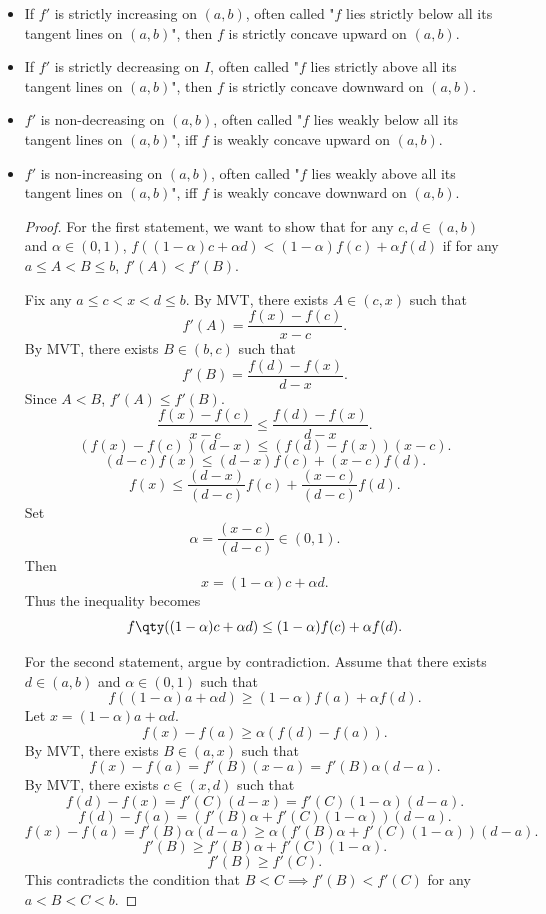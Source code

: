 \documentclass[a4paper,12pt]{report}
\begin{document}
\begin{itemize}
\begin{itemize}
\subsubsection{First Derivative Test for Concavity Theorem}
Let $f\colon I\subseteq\bbR\to\bbR$ be a function that is differentiable on an open interval $(a,b)\subseteq I$.
\bit
\item If $f'$ is strictly increasing on $(a,b)$, often called "$f$ lies strictly below all its tangent lines on $(a,b)$", then $f$ is strictly concave upward on $(a,b)$.
\item If $f'$ is strictly decreasing on $I$, often called "$f$ lies strictly above all its tangent lines on $(a,b)$", then $f$ is strictly concave downward on $(a,b)$.
\item $f'$ is non-decreasing on $(a,b)$, often called "$f$ lies weakly below all its tangent lines on $(a,b)$", iff $f$ is weakly concave upward on $(a,b)$.
\item $f'$ is non-increasing on $(a,b)$, often called "$f$ lies weakly above all its tangent lines on $(a,b)$", iff $f$ is weakly concave downward on $(a,b)$.
\eit
\begin{proof}
    For the first statement, we want to show that for any $c,d\in (a,b)$ and $\alpha\in(0,1)$, $f((1-\alpha)c+\alpha d)<(1-\alpha)f(c)+\alpha f(d)$ if for any $a\leq A<B\leq b$, $f'(A)<f'(B)$.

    Fix any $a\leq c<x<d\leq b$. By MVT, there exists $A\in (c,x)$ such that
    \[f'(A)=\frac{f(x)-f(c)}{x-c}.\]
    By MVT, there exists $B\in (b,c)$ such that
    \[f'(B)=\frac{f(d)-f(x)}{d-x}.\]
    Since $A<B$, $f'(A)\leq f'(B)$.
    \[\frac{f(x)-f(c)}{x-c}\leq\frac{f(d)-f(x)}{d-x}.\]
    \[(f(x)-f(c))(d-x)\leq(f(d)-f(x))(x-c).\]
    \[(d-c)f(x)\leq(d-x)f(c)+(x-c)f(d).\]
    \[f(x)\leq\frac{(d-x)}{(d-c)}f(c)+\frac{(x-c)}{(d-c)}f(d).\]
    Set
    \[\alpha=\frac{(x-c)}{(d-c)}\in(0,1).\]
    Then
    \[x=(1-\alpha)c+\alpha d.\]
    Thus the inequality becomes
    \[f\qty((1-\alpha)c+\alpha d)\leq(1-\alpha)f(c)+\alpha f(d).\]
    
    For the second statement, argue by contradiction. Assume that there exists $d\in(a,b)$ and $\alpha\in(0,1)$ such that
    \[f((1-\alpha)a+\alpha d)\geq (1-\alpha)f(a)+\alpha f(d).\]
    Let $x=(1-\alpha)a+\alpha d$.
    \[f(x)-f(a)\geq\alpha(f(d)-f(a)).\]
    By MVT, there exists $B\in (a,x)$ such that
    \[f(x)-f(a)=f'(B)(x-a)=f'(B)\alpha (d-a).\]
    By MVT, there exists $c\in (x,d)$ such that
    \[f(d)-f(x)=f'(C)(d-x)=f'(C)(1-\alpha)(d-a).\]
    \[f(d)-f(a)=(f'(B)\alpha+f'(C)(1-\alpha))(d-a).\]
    \[f(x)-f(a)=f'(B)\alpha (d-a)\geq\alpha(f'(B)\alpha+f'(C)(1-\alpha))(d-a).\]
    \[f'(B)\geq f'(B)\alpha+f'(C)(1-\alpha).\]
    \[f'(B)\geq f'(C).\]
    This contradicts the condition that $B<C\implies f'(B)<f'(C)$ for any $a<B<C<b$.
    

\end{proof}
\end{itemize}
\end{itemize}
\end{document}

